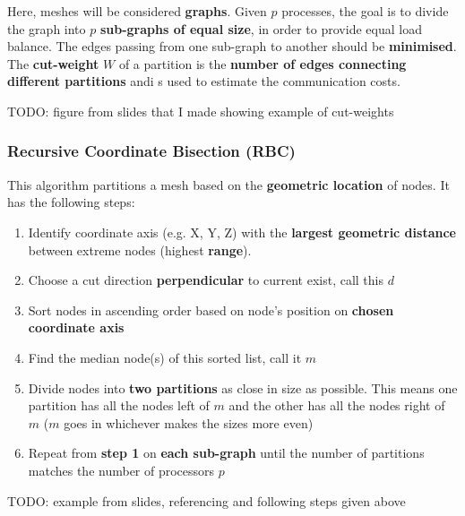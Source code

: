 \documentclass{article}
\begin{document}
Here, meshes will be considered \textbf{graphs}. Given $p$ processes, the goal is to divide the graph into $p$ \textbf{sub-graphs of equal size}, in order to provide equal load balance. The edges passing from one sub-graph to another should be \textbf{minimised}. The \textbf{cut-weight} $W$ of a partition is the \textbf{number of edges connecting different partitions} andi s used to estimate the communication costs.

TODO: figure from slides that I made showing example of cut-weights

\subsubsection{Recursive Coordinate Bisection (RBC)}

This algorithm partitions a mesh based on the \textbf{geometric location} of nodes. It has the following steps:
\begin{enumerate}
	\item Identify coordinate axis (e.g. X, Y, Z) with the \textbf{largest geometric distance} between extreme nodes (highest \textbf{range}).
	\item Choose a cut direction \textbf{perpendicular} to current exist, call this $d$
	\item Sort nodes in ascending order based on node's position on \textbf{chosen coordinate axis}
	\item Find the median node(s) of this sorted list, call it $m$
	\item Divide nodes into \textbf{two partitions} as close in size as possible. This means one partition has all the nodes left of $m$ and the other has all the nodes right of $m$ ($m$ goes in whichever makes the sizes more even)
	\item Repeat from \textbf{step 1} on \textbf{each sub-graph} until the number of partitions matches the number of processors $p$
\end{enumerate}

TODO: example from slides, referencing and following steps given above
\end{document}
